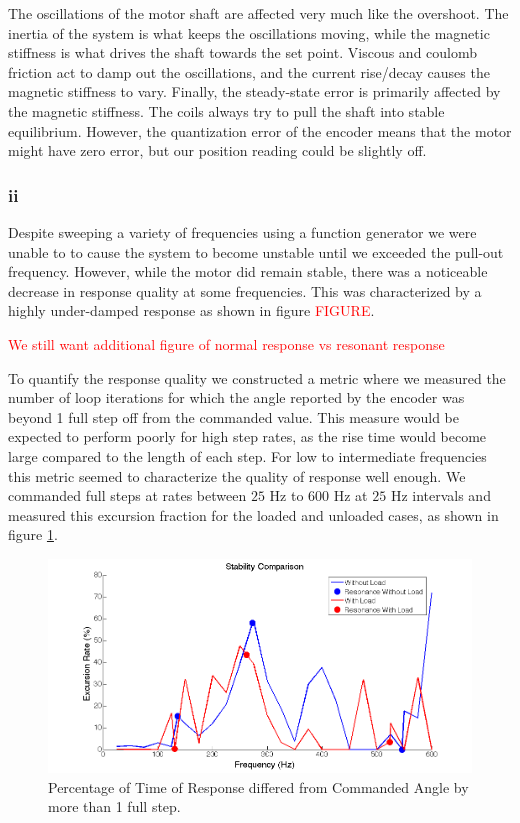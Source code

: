 \documentclass{article}
\newcommand{\xxx}[1]{\textcolor{red}{#1}}
\theoremstyle{plain}
\theoremstyle{definition}
\theoremstyle{remark}
\begin{document}
The oscillations of the motor shaft are affected very much like the overshoot. The inertia of the system is what keeps the oscillations moving, while the magnetic stiffness is what drives the shaft towards the set point. Viscous and coulomb friction act to damp out the oscillations, and the current rise/decay causes the magnetic stiffness to vary. Finally, the steady-state error is primarily affected by the magnetic stiffness. The coils always try to pull the shaft into stable equilibrium. However, the quantization error of the encoder means that the motor might have zero error, but our position reading could be slightly off.\\


\clearpage
\subsubsection*{ii}

Despite sweeping a variety of frequencies using a function generator we were unable to to cause the system to become unstable until we exceeded the pull-out frequency.  However, while the motor did remain stable, there was a noticeable decrease in response quality at some frequencies.  This was characterized by a highly under-damped response as shown in figure \xxx{FIGURE}.  

\xxx{We still want additional figure of normal response vs resonant response}

To quantify the response quality we constructed a metric where we measured the number of loop iterations for which the angle reported by the encoder was beyond 1 full step off from the commanded value.  This measure would be expected to perform poorly for high step rates, as the rise time would become large compared to the length of each step.  For low to intermediate frequencies this metric seemed to characterize the quality of response well enough.  We commanded full steps at rates between $25$ Hz to $600$ Hz at $25$ Hz intervals and measured this excursion fraction for the loaded and unloaded cases, as shown in figure \ref{q3aii}.



\begin{figure}[hbt]
\begin{center}
\includegraphics[width = 15cm]{ResonanceData.png}
\caption{Percentage of Time of Response differed from Commanded Angle by more than 1 full step.}
\label{q3aii}
\end{center}
\end{figure}
\end{document}
